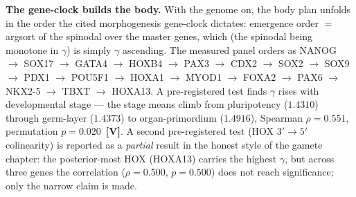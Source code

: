 \documentclass[11pt]{article}
\newcommand{\gradeV}{\textcolor{verified}{\textbf{[V]}}}
\begin{document}
\textbf{The gene-clock builds the body.} With the genome on, the body plan unfolds in the order the cited
morphogenesis gene-clock dictates: emergence order $=$ argsort of the spinodal over the master genes, which
(the spinodal being monotone in $\gamma$) is simply $\gamma$ ascending. The measured panel orders as
NANOG $\to$ SOX17 $\to$ GATA4 $\to$ HOXB4 $\to$ PAX3 $\to$ CDX2 $\to$ SOX2 $\to$ SOX9 $\to$ PDX1 $\to$ POU5F1 $\to$ HOXA1 $\to$ MYOD1 $\to$ FOXA2 $\to$ PAX6 $\to$ NKX2-5 $\to$ TBXT $\to$ HOXA13. A pre-registered test finds $\gamma$ rises with developmental stage --- the stage
means climb from pluripotency ($1.4310$) through germ-layer ($1.4373$) to
organ-primordium ($1.4916$), Spearman $\rho=0.551$,
permutation $p=0.020$~\gradeV{}. A second pre-registered test
(HOX $3'\!\to\!5'$ colinearity) is reported as a \emph{partial} result in the honest style of the gamete
chapter: the posterior-most HOX (HOXA13) carries the highest
$\gamma$, but across three genes the correlation ($\rho=0.500$,
$p=0.500$) does not reach significance; only the narrow claim is made.
\end{document}
